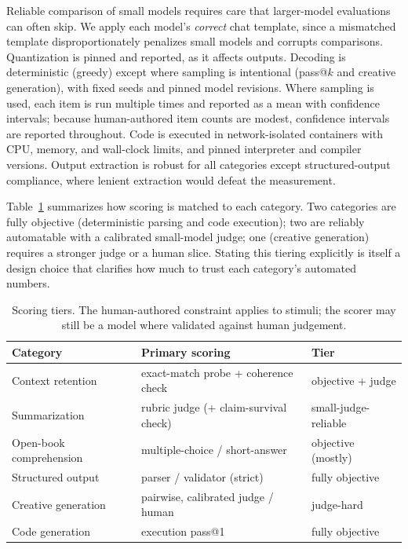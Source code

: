 \documentclass[runningheads]{llncs}
\begin{document}
Reliable comparison of small models requires care that larger-model evaluations
can often skip. We apply each model's \emph{correct} chat template, since a
mismatched template disproportionately penalizes small models and corrupts
comparisons. Quantization is pinned and reported, as it affects outputs.
Decoding is deterministic (greedy) except where sampling is intentional
(pass@$k$ and creative generation), with fixed seeds and pinned model revisions.
Where sampling is used, each item is run multiple times and reported as a mean
with confidence intervals; because human-authored item counts are modest,
confidence intervals are reported throughout. Code is executed in network-isolated
containers with CPU, memory, and wall-clock limits, and pinned interpreter and
compiler versions. Output extraction is robust for all categories except
structured-output compliance, where lenient extraction would defeat the
measurement.

Table~\ref{tab:tiers} summarizes how scoring is matched to each category. Two
categories are fully objective (deterministic parsing and code execution); two
are reliably automatable with a calibrated small-model judge; one (creative
generation) requires a stronger judge or a human slice. Stating this tiering
explicitly is itself a design choice that clarifies how much to trust each
category's automated numbers.

\begin{table}[t]
\caption{Scoring tiers. The human-authored constraint applies to stimuli; the
scorer may still be a model where validated against human judgement.}
\label{tab:tiers}
\centering
\footnotesize
\begin{tabular}{@{}lll@{}}
\toprule
Category & Primary scoring & Tier \\
\midrule
Context retention      & exact-match probe + coherence check & objective + judge \\
Summarization          & rubric judge (+ claim-survival check) & small-judge-reliable \\
Open-book comprehension & multiple-choice / short-answer & objective (mostly) \\
Structured output      & parser / validator (strict) & fully objective \\
Creative generation    & pairwise, calibrated judge / human & judge-hard \\
Code generation        & execution pass@1 & fully objective \\
\bottomrule
\end{tabular}
\end{table}
\end{document}
